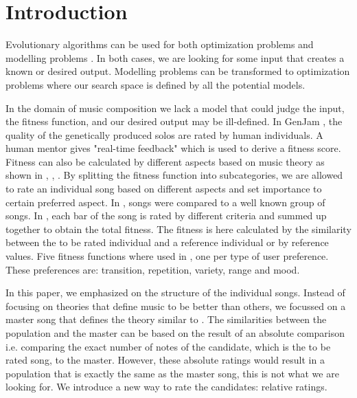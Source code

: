 \section{Introduction} %
Evolutionary algorithms can be used for both optimization problems and modelling problems \cite{BOOK:GA}. In both cases, we are looking for some input that creates a known or desired output. Modelling problems can be transformed to optimization problems where our search space is defined by all the potential models. %

In the domain of music composition we lack a model that could judge the input, the fitness function, and our desired output may be ill-defined. In GenJam \cite{PAPER:GENJAM}, the quality of the genetically produced solos are rated by human individuals. A human mentor gives "real-time feedback" which is used to derive a fitness score. Fitness can also be calculated by different  aspects based on music theory as shown in \cite{PAPER:DRAGAN}, \cite{PAPER:GUPEA}, \cite{PAPER:MAGMA}. By splitting the fitness function into subcategories, we are allowed to rate an individual song based on different aspects and set importance to certain preferred aspect. In \cite{PAPER:GUPEA}, songs were compared to a well known group of songs. In \cite{PAPER:DRAGAN}, each bar of the song is rated by different criteria and summed up together to obtain the total fitness. The fitness is here calculated by the similarity between the to be rated individual and a reference individual or by reference values.  Five fitness functions where used in \cite{PAPER:MAGMA}, one per type of user preference. These preferences are: transition, repetition, variety, range and mood.

In this paper, we emphasized on the structure of the individual songs. Instead of focusing on theories that define music to be better than others, we focussed on a master song that defines the theory similar to \cite{PAPER:DRAGAN}. The similarities between the population and the master can be based on the result of an absolute comparison i.e. comparing the exact number of notes of the candidate, which is the to be rated song, to the master. However, these absolute ratings would result in a population that is exactly the same as the master song, this is not what we are looking for. We introduce a new way to rate the candidates: relative ratings.




